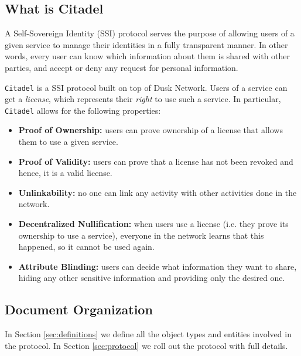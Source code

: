 
\subsection{What is Citadel} 

A Self-Sovereign Identity (SSI) protocol serves the purpose of allowing users of a given service to manage their identities in a fully transparent manner. In other words, every user can know which information about them is shared with other parties, and accept or deny any request for personal information.

\verb!Citadel! is a SSI protocol built on top of Dusk Network. Users of a service can get a \textit{license}, which represents their \textit{right} to use such a service. In particular, \verb!Citadel! allows for the following properties:

\begin{itemize}
	\item \textbf{Proof of Ownership:} users can prove ownership of a license that allows them to use a given service.
	\item \textbf{Proof of Validity:} users can prove that a license has not been revoked and hence, it is a valid license.
 	\item \textbf{Unlinkability:} no one can link any activity with other activities done in the network.
 	\item \textbf{Decentralized Nullification:} when users use a license (i.e. they prove its ownership to use a service), everyone in the network learns that this happened, so it cannot be used again.
	\item \textbf{Attribute Blinding:} users can decide what information they want to share, hiding any other sensitive information and providing only the desired one.
\end{itemize}

\subsection{Document Organization} 

In Section \ref{sec:definitions} we define all the object types and entities involved in the protocol. In Section \ref{sec:protocol} we roll out the protocol with full details.